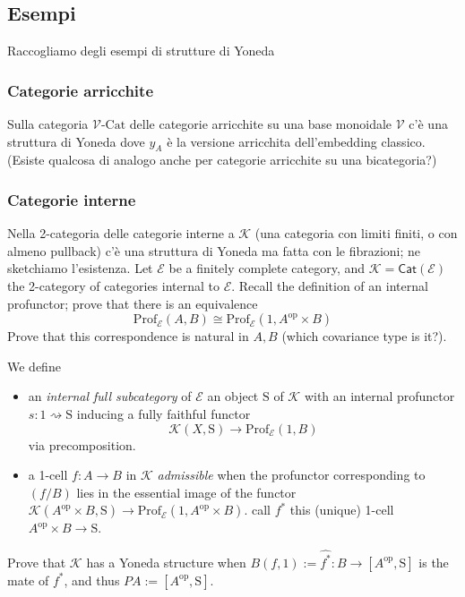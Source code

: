 \documentclass[11pt]{article}
\def\Cat{\mathsf{Cat}}
\def\opp{\mathrm{op}}
\theoremstyle{reference}
\begin{document}
\subsection{Esempi}
\label{sec:org25a9bff}

Raccogliamo degli esempi di strutture di Yoneda

\subsubsection{Categorie arricchite}
\label{sec:orgaff7d20}

Sulla categoria \(\mathcal V\text{-Cat}\) delle categorie
  arricchite su una base monoidale \(\mathcal V\) c'è una
  struttura di Yoneda dove \(y_A\) è la versione arricchita
  dell'embedding classico. (Esiste qualcosa di analogo anche
  per categorie arricchite su una bicategoria?)

\subsubsection{Categorie interne}
\label{sec:org6bbb0d4}

Nella 2-categoria delle categorie interne a \(\mathcal K\)
  (una categoria con limiti finiti, o con almeno pullback)
  c'è una struttura di Yoneda ma fatta con le fibrazioni; ne
  sketchiamo l'esistenza. Let \(\mathcal E\) be a finitely
  complete category, and \(\mathcal K = \Cat(\mathcal E)\) the
  2-category of categories internal to \(\mathcal E\). Recall
  the definition of an internal profunctor; prove that there
  is an equivalence $$ \mathrm{Prof}_{\mathcal E}(A,B) \cong
  \mathrm{Prof}_{\mathcal E}(1,A^\opp\times B)$$ Prove that
  this correspondence is natural in \(A,B\) (which covariance
  type is it?).

We define

\begin{itemize}
\item an \emph{internal full subcategory} of \(\mathcal E\) an
object \(\mathrm{S}\) of \(\mathcal K\) with an internal
profunctor \(s : 1 \rightsquigarrow \mathrm{S}\) inducing a
fully faithful functor \[\mathcal K(X,\mathrm{S}) \to
\mathrm{Prof}_{\mathcal E}(1,B)\] via precomposition. \item
a 1-cell \(f : A\to B\) in \(\mathcal K\) \emph{admissible} when
the profunctor corresponding to \((f/B)\) lies in the
essential image of the functor \(\mathcal K(A^\opp\times
B,\mathrm{S}) \to \mathrm{Prof}_{\mathcal E}(1,A^\opp\times
B)\). call \(f^*\) this (unique) 1-cell \(A^\opp\times B \to
\mathrm{S}\). \end{itemize} Prove that \(\mathcal K\) has a
Yoneda structure when \(B(f,1) := \widehat{f^*} : B \to
[A^\opp,\mathrm{S}]\) is the mate of \(f^*\), and thus \(P A :=
[A^\opp,\mathrm{S}]\).
\end{document}
